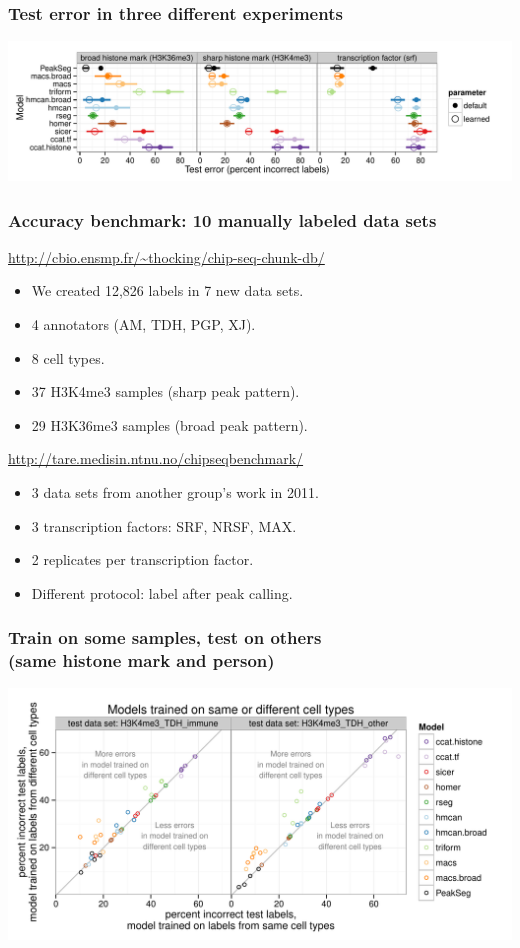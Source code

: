 \documentclass{beamer}
\begin{document}
\begin{frame}
  \frametitle{Test error in three different experiments}
  \includegraphics[width=1.1\textwidth]{figure-test-error-dots-mean.pdf}
\end{frame}

\begin{frame}
  \frametitle{Accuracy benchmark: 10 manually labeled data sets}
  \url{http://cbio.ensmp.fr/~thocking/chip-seq-chunk-db/}
  \begin{itemize}
  \item We created 12,826 labels in 7 new data sets.
  \item 4 annotators (AM, TDH, PGP, XJ).
  \item 8 cell types.
  \item 37 H3K4me3 samples (sharp peak pattern).
  \item 29 H3K36me3 samples (broad peak pattern).
  \end{itemize}
  \vskip 1cm
  \url{http://tare.medisin.ntnu.no/chipseqbenchmark/}
  \begin{itemize}
  \item 3 data sets from another group's work in 2011.
  \item 3 transcription factors: SRF, NRSF, MAX.
  \item 2 replicates per transcription factor.
  \item Different protocol: label after peak calling.
  \end{itemize}
\end{frame}

\begin{frame}
  \frametitle{Train on some samples, test on others\\
(same histone mark and person)}
  \includegraphics[width=1.1\textwidth]{figure-test-H3K4me3-types.pdf}
\end{frame}
\end{document}
